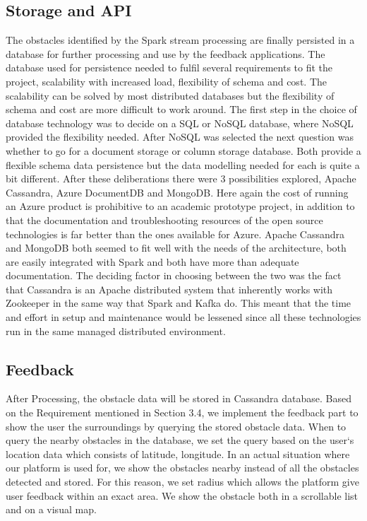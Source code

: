 \documentclass[prodmode,acmtosem]{acmsmall} %
\begin{document}
\subsection{Storage and API}
The obstacles identified by the Spark stream processing are finally persisted in a database for further processing and use by the feedback applications. The database used for persistence needed to fulfil several requirements to fit the project, scalability with increased load, flexibility of schema and cost. The scalability can be solved by most distributed databases but the flexibility of schema and cost are more difficult to work around. The first step in the choice of database technology was to decide on a SQL or NoSQL database, where NoSQL provided the flexibility needed. After NoSQL was selected the next question was whether to go for a document storage or column storage database. Both provide a flexible schema data persistence but the data modelling needed for each is quite a bit different. After these deliberations there were 3 possibilities explored, Apache Cassandra, Azure DocumentDB and MongoDB. Here again the cost of running an Azure product is prohibitive to an academic prototype project, in addition to that the documentation and troubleshooting resources of the open source technologies is far better than the ones available for Azure. Apache Cassandra and MongoDB both seemed to fit well with the needs of the architecture, both are easily integrated with Spark and both have more than adequate documentation. The deciding factor in choosing between the two was the fact that Cassandra is an Apache distributed system that inherently works with Zookeeper in the same way that Spark and Kafka do. This meant that the time and effort in setup and maintenance would be lessened since all these technologies run in the same managed distributed environment.
\subsection{Feedback}
After Processing, the obstacle data will be stored in Cassandra database. Based on the Requirement mentioned in Section 3.4, we implement the feedback part to show the user the surroundings by querying the stored obstacle data. When to query the nearby obstacles in the database, we set the query based on the user‘s location data which consists of latitude, longitude. In an actual situation where our platform is used for, we show the obstacles nearby instead of all the obstacles detected and stored. For this reason, we set radius which allows the platform give user feedback within an exact area. We show the obstacle both in a scrollable list and on a visual map.
\end{document}
